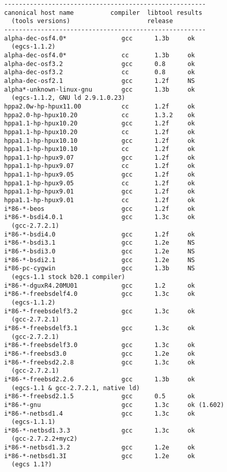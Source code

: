 \begin{Verbatim}[frame=single]
-------------------------------------------------------
canonical host name          compiler  libtool results
  (tools versions)                     release
-------------------------------------------------------
alpha-dec-osf4.0*               gcc      1.3b     ok
  (egcs-1.1.2)
alpha-dec-osf4.0*               cc       1.3b     ok
alpha-dec-osf3.2                gcc      0.8      ok
alpha-dec-osf3.2                cc       0.8      ok
alpha-dec-osf2.1                gcc      1.2f     NS
alpha*-unknown-linux-gnu        gcc      1.3b     ok
  (egcs-1.1.2, GNU ld 2.9.1.0.23)
hppa2.0w-hp-hpux11.00           cc       1.2f     ok
hppa2.0-hp-hpux10.20            cc       1.3.2    ok
hppa1.1-hp-hpux10.20            gcc      1.2f     ok
hppa1.1-hp-hpux10.20            cc       1.2f     ok
hppa1.1-hp-hpux10.10            gcc      1.2f     ok
hppa1.1-hp-hpux10.10            cc       1.2f     ok
hppa1.1-hp-hpux9.07             gcc      1.2f     ok
hppa1.1-hp-hpux9.07             cc       1.2f     ok
hppa1.1-hp-hpux9.05             gcc      1.2f     ok
hppa1.1-hp-hpux9.05             cc       1.2f     ok
hppa1.1-hp-hpux9.01             gcc      1.2f     ok
hppa1.1-hp-hpux9.01             cc       1.2f     ok
i*86-*-beos                     gcc      1.2f     ok
i*86-*-bsdi4.0.1                gcc      1.3c     ok
  (gcc-2.7.2.1)
i*86-*-bsdi4.0                  gcc      1.2f     ok
i*86-*-bsdi3.1                  gcc      1.2e     NS
i*86-*-bsdi3.0                  gcc      1.2e     NS
i*86-*-bsdi2.1                  gcc      1.2e     NS
i*86-pc-cygwin                  gcc      1.3b     NS
  (egcs-1.1 stock b20.1 compiler)
i*86-*-dguxR4.20MU01            gcc      1.2      ok
i*86-*-freebsdelf4.0            gcc      1.3c     ok
  (egcs-1.1.2)
i*86-*-freebsdelf3.2            gcc      1.3c     ok
  (gcc-2.7.2.1)
i*86-*-freebsdelf3.1            gcc      1.3c     ok
  (gcc-2.7.2.1)
i*86-*-freebsdelf3.0            gcc      1.3c     ok
i*86-*-freebsd3.0               gcc      1.2e     ok
i*86-*-freebsd2.2.8             gcc      1.3c     ok
  (gcc-2.7.2.1)
i*86-*-freebsd2.2.6             gcc      1.3b     ok
  (egcs-1.1 & gcc-2.7.2.1, native ld)
i*86-*-freebsd2.1.5             gcc      0.5      ok
i*86-*-gnu                      gcc      1.3c     ok (1.602)
i*86-*-netbsd1.4                gcc      1.3c     ok
  (egcs-1.1.1)
i*86-*-netbsd1.3.3              gcc      1.3c     ok
  (gcc-2.7.2.2+myc2)
i*86-*-netbsd1.3.2              gcc      1.2e     ok
i*86-*-netbsd1.3I               gcc      1.2e     ok
  (egcs 1.1?)

\end{Verbatim}
